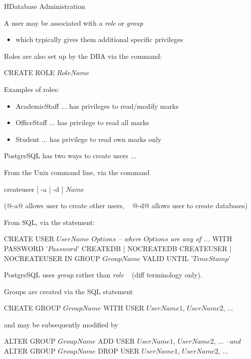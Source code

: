 \begin{lecture}{H}{Database Administration}
\begin{slide}
A user may be associated with a {\em{role}} or {\em{group}}
\begin{itemize}
\item which typically gives them additional specific privileges
\end{itemize}
Roles are also set up by the DBA via the command:
\begin{syntax}
    CREATE ROLE \(RoleName\)
\end{syntax}
Examples of roles:
\begin{itemize}
\item AcademicStaff ... has privileges to read/modify marks
\item OfficeStaff ... has privilege to read all marks
\item Student ... has privilege to read own marks only
\end{itemize}
\end{slide}

\begin{slide}
PostgreSQL has two ways to create users ...

From the Unix command line, via the command
\begin{syntax}
    createuser [ -a | -d ] \(Name\) 
\end{syntax}
{\small 
(@-a@ allows user to create other users, ~ @-d@ allows user to create databases)
}

From SQL, via the statement:
\begin{syntax}
    CREATE USER \(UserName\) \(Options\)
    {\textit{-- where \(Options\) are any of ...}}
    WITH PASSWORD '\(Password\)'
    CREATEDB | NOCREATEDB
    CREATEUSER | NOCREATEUSER
    IN GROUP \(GroupName\)
    VALID UNTIL '\(TimeStamp\)'
\end{syntax}
\end{slide}

\begin{slide}
PostgreSQL uses {\em{group}} rather than {\em{role}}
	~ {\small (diff terminology only)}.

Groups are created via the SQL statement
\begin{syntax}
    CREATE GROUP \(GroupName\)
    WITH USER \(UserName1\), \(UserName2\), ...
\end{syntax}
and may be subsequently modified by
\begin{syntax}
    ALTER GROUP \(GroupName\)
    ADD USER \(UserName1\), \(UserName2\), ...
    {\textit{--and}}
    ALTER GROUP \(GroupName\)
    DROP USER \(UserName1\), \(UserName2\), ...
\end{syntax}
\end{slide}


\end{lecture}
